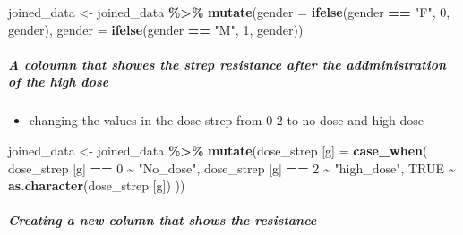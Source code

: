\documentclass[
]{article}
\newenvironment{Shaded}{\begin{snugshade}}{\end{snugshade}}
\newcommand{\AttributeTok}[1]{\textcolor[rgb]{0.13,0.29,0.53}{#1}}
\newcommand{\ConstantTok}[1]{\textcolor[rgb]{0.56,0.35,0.01}{#1}}
\newcommand{\DecValTok}[1]{\textcolor[rgb]{0.00,0.00,0.81}{#1}}
\newcommand{\FunctionTok}[1]{\textcolor[rgb]{0.13,0.29,0.53}{\textbf{#1}}}
\newcommand{\NormalTok}[1]{#1}
\newcommand{\OtherTok}[1]{\textcolor[rgb]{0.56,0.35,0.01}{#1}}
\newcommand{\SpecialCharTok}[1]{\textcolor[rgb]{0.81,0.36,0.00}{\textbf{#1}}}
\newcommand{\StringTok}[1]{\textcolor[rgb]{0.31,0.60,0.02}{#1}}
\providecommand{\tightlist}{%
  \setlength{\itemsep}{0pt}\setlength{\parskip}{0pt}}
\begin{document}
\begin{Shaded}
\begin{Highlighting}[]
\NormalTok{joined\_data }\OtherTok{\textless{}{-}}\NormalTok{ joined\_data }\SpecialCharTok{\%\textgreater{}\%}
  \FunctionTok{mutate}\NormalTok{(}\AttributeTok{gender =} \FunctionTok{ifelse}\NormalTok{(gender }\SpecialCharTok{==} \StringTok{"F"}\NormalTok{, }\DecValTok{0}\NormalTok{, gender),}
         \AttributeTok{gender =} \FunctionTok{ifelse}\NormalTok{(gender }\SpecialCharTok{==} \StringTok{"M"}\NormalTok{, }\DecValTok{1}\NormalTok{, gender))}
\end{Highlighting}
\end{Shaded}

\subparagraph{A coloumn that showes the strep resistance after the
addministration of the high
dose}\label{a-coloumn-that-showes-the-strep-resistance-after-the-addministration-of-the-high-dose}

\begin{itemize}
\tightlist
\item
  changing the values in the dose strep from 0-2 to no dose and high
  dose
\end{itemize}

\begin{Shaded}
\begin{Highlighting}[]
\NormalTok{joined\_data }\OtherTok{\textless{}{-}}\NormalTok{ joined\_data }\SpecialCharTok{\%\textgreater{}\%}
  \FunctionTok{mutate}\NormalTok{(}\StringTok{\textasciigrave{}}\AttributeTok{dose\_strep [g]}\StringTok{\textasciigrave{}} \OtherTok{=} \FunctionTok{case\_when}\NormalTok{(}
    \StringTok{\textasciigrave{}}\AttributeTok{dose\_strep [g]}\StringTok{\textasciigrave{}} \SpecialCharTok{==} \DecValTok{0} \SpecialCharTok{\textasciitilde{}} \StringTok{"No\_dose"}\NormalTok{,}
    \StringTok{\textasciigrave{}}\AttributeTok{dose\_strep [g]}\StringTok{\textasciigrave{}} \SpecialCharTok{==} \DecValTok{2} \SpecialCharTok{\textasciitilde{}} \StringTok{"high\_dose"}\NormalTok{,}
    \ConstantTok{TRUE} \SpecialCharTok{\textasciitilde{}} \FunctionTok{as.character}\NormalTok{(}\StringTok{\textasciigrave{}}\AttributeTok{dose\_strep [g]}\StringTok{\textasciigrave{}}\NormalTok{)}
\NormalTok{  ))}
\end{Highlighting}
\end{Shaded}

\subparagraph{Creating a new column that shows the
resistance}\label{creating-a-new-column-that-shows-the-resistance}
\end{document}
